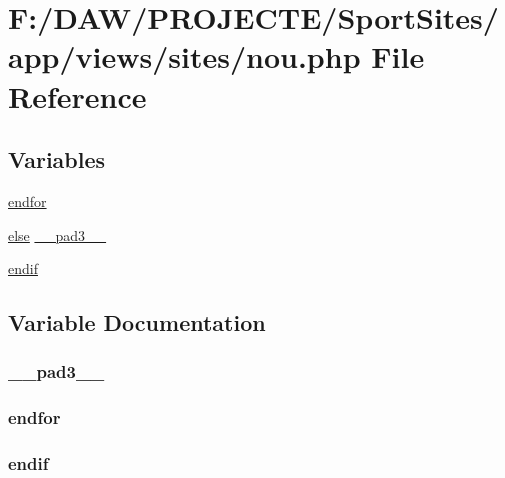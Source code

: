 \hypertarget{sites_2nou_8php}{}\section{F\+:/\+D\+A\+W/\+P\+R\+O\+J\+E\+C\+T\+E/\+Sport\+Sites/app/views/sites/nou.php File Reference}
\label{sites_2nou_8php}
\subsection*{Variables}
\begin{DoxyCompactItemize}
\item 
\hyperlink{sites_2nou_8php_ae8fdc27183f296411bac00ed522ee1ac}{endfor}
\item 
\hyperlink{header_8php_ae69d798cba64778886b1a564b11f2793}{else} \hyperlink{sites_2nou_8php_ad3aa1069376b85bd4e503b216d54b18d}{\+\_\+\+\_\+pad3\+\_\+\+\_\+}
\item 
\hyperlink{sites_2nou_8php_a82cd33ca97ff99f2fcc5e9c81d65251b}{endif}
\end{DoxyCompactItemize}


\subsection{Variable Documentation}
\hypertarget{sites_2nou_8php_ad3aa1069376b85bd4e503b216d54b18d}{}
\subsubsection[{\+\_\+\+\_\+pad3\+\_\+\+\_\+}]{ \+\_\+\+\_\+pad3\+\_\+\+\_\+}\label{sites_2nou_8php_ad3aa1069376b85bd4e503b216d54b18d}
\hypertarget{sites_2nou_8php_ae8fdc27183f296411bac00ed522ee1ac}{}
\subsubsection[{endfor}]{\setlength{\rightskip}{0pt plus 5cm}endfor}\label{sites_2nou_8php_ae8fdc27183f296411bac00ed522ee1ac}
\hypertarget{sites_2nou_8php_a82cd33ca97ff99f2fcc5e9c81d65251b}{}
\subsubsection[{endif}]{\setlength{\rightskip}{0pt plus 5cm}endif}\label{sites_2nou_8php_a82cd33ca97ff99f2fcc5e9c81d65251b}
